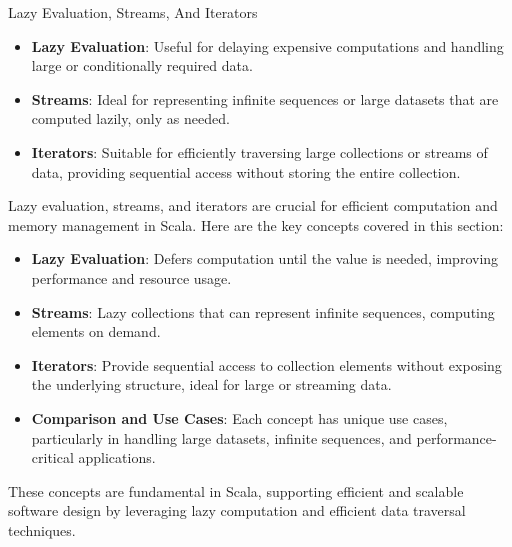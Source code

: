 \begin{notes}{Lazy Evaluation, Streams, And Iterators}
\begin{highlight}
        \begin{itemize}
            \item \textbf{Lazy Evaluation}: Useful for delaying expensive computations and handling large or conditionally required data.
            \item \textbf{Streams}: Ideal for representing infinite sequences or large datasets that are computed lazily, only as needed.
            \item \textbf{Iterators}: Suitable for efficiently traversing large collections or streams of data, providing sequential access without storing the entire collection.
        \end{itemize}
    
    \end{highlight}
    
    \begin{highlight}
    
        Lazy evaluation, streams, and iterators are crucial for efficient computation and memory management in Scala. Here are the key concepts covered in this section:
    
        \begin{itemize}
            \item \textbf{Lazy Evaluation}: Defers computation until the value is needed, improving performance and resource usage.
            \item \textbf{Streams}: Lazy collections that can represent infinite sequences, computing elements on demand.
            \item \textbf{Iterators}: Provide sequential access to collection elements without exposing the underlying structure, ideal for large or streaming data.
            \item \textbf{Comparison and Use Cases}: Each concept has unique use cases, particularly in handling large datasets, infinite sequences, and performance-critical applications.
        \end{itemize}
    
        These concepts are fundamental in Scala, supporting efficient and scalable software design by leveraging lazy computation and efficient data traversal techniques.
    
    \end{highlight}
\end{notes}